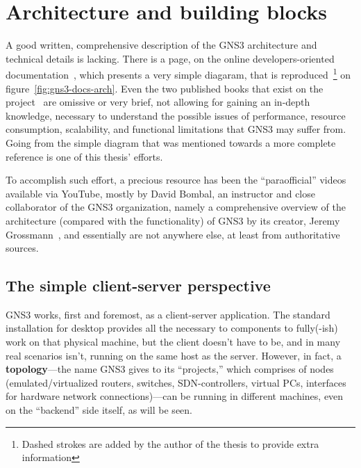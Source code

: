 \section{Architecture and building blocks}
\label{sec:gns3architecture}

A good written, comprehensive description of the GNS3 architecture and technical details is lacking.
There is a page, on the online developers-oriented documentation~\cite{gns3devarch}, which presents a very simple diagaram, that is reproduced~\footnote{Dashed strokes are added by the author of the thesis to provide extra information} on figure~\ref{fig:gns3-docs-arch}.
Even the two published books that exist on the project~\cite{gns3netsimguide,thebookofgns3} are omissive or very brief, not allowing for gaining an in-depth knowledge, necessary to understand the possible issues of performance, resource consumption, scalability, and functional limitations that GNS3 may suffer from.
Going from the simple diagram that was mentioned towards a more complete reference is one of this thesis' efforts.

To accomplish such effort, a precious resource has been the ``paraofficial'' videos available via YouTube, mostly by David Bombal, an instructor and close collaborator of the GNS3 organization, namely a comprehensive overview of the architecture (compared with the functionality) of GNS3 by its creator, Jeremy Grossmann~\cite{ytgns3arch22}, and essentially are not anywhere else, at least from authoritative sources. %



\subsection{The simple client-server perspective}
\label{subsec:gns3clientserver}

GNS3 works, first and foremost, as a client-server application.
The standard installation for desktop provides all the necessary to components to fully(-ish) work on that physical machine, but the client doesn't have to be, and in many real scenarios isn't, running on the same host as the server.
However, in fact, a \textbf{topology}---the name GNS3 gives to its ``projects,'' which comprises of nodes (emulated/virtualized routers, switches, SDN-controllers, virtual PCs, interfaces for hardware network connections)---can be running in different machines, even on the ``backend'' side itself, as will be seen.

